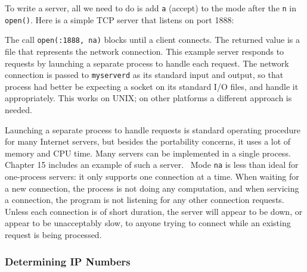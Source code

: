 To write a server, all we need to do is add
\texttt{{\textquotedbl}a{\textquotedbl}} (accept) to the mode after the
\texttt{{\textquotedbl}n{\textquotedbl}} in \texttt{open()}. Here is a
simple TCP server that listens on port 1888:


The call \texttt{open({\textquotedbl}:1888{\textquotedbl},
{\textquotedbl}na{\textquotedbl})} blocks until a client connects.
The returned value is a file that represents the network connection.
This example server
responds to requests by launching a separate process to handle each
request. The network connection is passed to \texttt{myserverd} as its
standard input and output, so that process had better be expecting a
socket on its standard I/O files, and handle it appropriately.
This works on UNIX; on other platforms a different approach is needed.

Launching a separate process to handle requests is standard operating
procedure for many Internet servers, but besides the portability
concerns, it uses a lot of memory and CPU time. Many servers can be
implemented in a single process. Chapter 15 includes an example of such
a server. \ Mode \texttt{{\textquotedbl}na{\textquotedbl}} is less than
ideal for one-process servers: it only supports one connection at a
time. When waiting for a new connection, the process is not doing any
computation, and when servicing a connection, the program is not
listening for any other connection requests. Unless each connection is
of short duration, the server will appear to be down, or appear to be
unacceptably slow, to anyone trying to connect while an existing
request is being processed.

\subsubsection[Determining IP Numbers]{\sffamily Determining IP Numbers}

